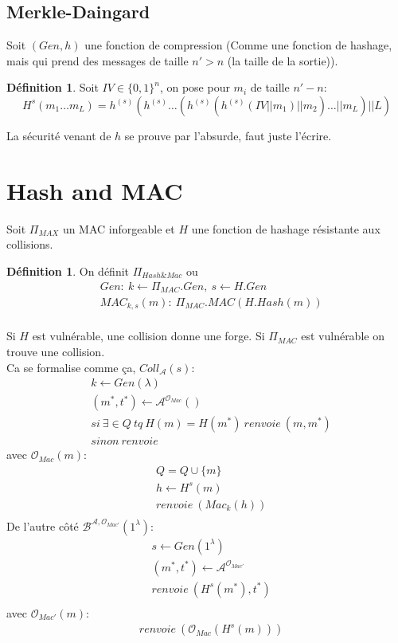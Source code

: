 \documentclass[12pt]{article}
\theoremstyle{plain}
\theoremstyle{definition}
\newtheorem{defn}[subsubsection]{D\'efinition}
\theoremstyle{remark}
\newcommand{\A}{\mathcal{A}}
\newcommand{\Or}{\mathcal{O}}
\begin{document}
\subsection{Merkle-Daingard}
Soit $(Gen, h)$ une fonction de compression (Comme une 
fonction de hashage, mais qui prend des messages 
de taille $n' > n$ (la taille de la sortie)).\\
\begin{defn}
    Soit $IV\in\{0,1\}^n$, on pose pour $m_i$ de taille 
    $n'-n$: \[H^s(m_1\ldots m_L)
    =h^{(s)}(h^{(s)}\ldots (h^{(s)}(h^{(s)}(IV||m_1)||m_2)\ldots||m_L)|| L)\]
\end{defn}

La sécurité venant de $h$ se prouve par l'absurde, faut juste 
l'écrire.

\section{Hash and MAC}
Soit $\Pi_{MAX}$ un MAC inforgeable et $H$ une fonction 
de hashage résistante aux collisions.
\begin{defn}
    On définit $\Pi_{Hash\&Mac}$ ou 
    \begin{align*}
        &Gen:~k\leftarrow \Pi_{MAC}.Gen,~s\leftarrow H.Gen\\
        &MAC_{k,s}(m):~\Pi_{MAC}.MAC(H.Hash(m))\\
    \end{align*}
\end{defn}
Si $H$ est vulnérable, une collision donne une forge.
Si $\Pi_{MAC}$ est vulnérable on trouve une collision.\\
\indent Ca se formalise comme ça, $Coll_{\A}(s):$
\begin{align*}
    &k\leftarrow Gen(\lambda)\\    
    &(m^*,t^*)\leftarrow \A^{\Or_{Mac}}()\\
    &si~\exists\in Q~tq~H(m)=H(m^*)~renvoie~(m,m^*)\\
    &sinon~renvoie~
\end{align*}
avec $\Or_{Mac}(m):$
\begin{align*}
    &Q=Q\cup\{m\}\\
    &h\leftarrow H^s(m)\\
    &renvoie~(Mac_k(h))\\
\end{align*}
De l'autre côté $\mathcal{B}^{\A,\Or_{Mac'}}(1^{\lambda}):$
\begin{align*}
    &s\leftarrow Gen(1^{\lambda})\\
    &(m^*,t^*)\leftarrow \A^{\Or_{Mac'}}\\
    &renvoie~(H^s(m^*),t^*)\\
\end{align*}
avec $\Or_{Mac'}(m):$
\begin{align*}
    &renvoie~(\Or_{Mac}(H^s(m)))\\
\end{align*}
\end{document}
